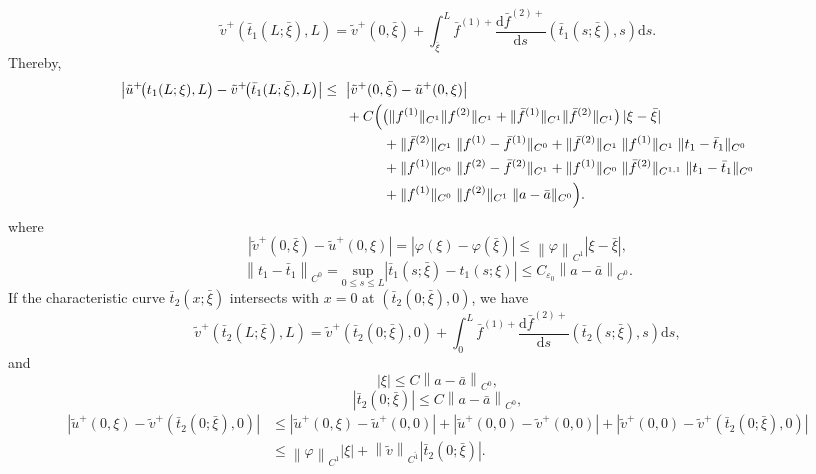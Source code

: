 \documentclass[a4paper,reqno,11pt]{amsart}
\numberwithin{equation}{section} %
\begin{document}
$$
\tilde{v}^{+}\left( \bar{t}_1\left( L;\bar{\xi} \right) ,L \right) =\tilde{v}^{+}(0,\bar{\xi})+\int_{\bar{\xi} }^L{\bar{f}^{(1)+}\frac{\mathrm{d}\bar{f}^{(2)+}}{\mathrm{d}s}\left( \bar{t}_1\left( s;\bar{\xi} \right) ,s \right) \mathrm{d}s}.
$$
Thereby,
$$
\begin{aligned}
\bigl|\tilde u^+\!\bigl(t_1(L;\xi),L\bigr)-\tilde{v}^{+}\!\bigl(\bar t_1(L;\bar\xi),L\bigr)\bigr|
\le{}&\ \bigl|\tilde{v}^{+}(0,\bar\xi)-\tilde u^+(0,\xi)\bigr| \\
&\ + C\Bigl(
   \bigl(\|f^{(1)}\|_{C^{1}}\|f^{(2)}\|_{C^{1}}
     + \|\bar f^{(1)}\|_{C^{1}}\|\bar f^{(2)}\|_{C^{1}}\bigr)\,|\xi-\bar\xi| \Bigr.\\
&\qquad\quad
   + \|\bar f^{(2)}\|_{C^{1}}\;\|f^{(1)}-\bar f^{(1)}\|_{C^{0}}
   + \|\bar f^{(2)}\|_{C^{1}}\;\|f^{(1)}\|_{C^{1}}\;\|t_1-\bar t_1\|_{C^{0}} \\
&\qquad\quad
   + \|f^{(1)}\|_{C^{0}}\;\|f^{(2)}-\bar f^{(2)}\|_{C^{1}}
   + \|f^{(1)}\|_{C^{0}}\;\|\bar f^{(2)}\|_{C^{1,1}}\;\|t_1-\bar t_1\|_{C^{0}} \\
&\qquad\quad
   + \Bigl. \|f^{(1)}\|_{C^{0}}\;\|f^{(2)}\|_{C^{1}}\;\|a-\bar a\|_{C^{0}}
\Bigr).
\end{aligned}
$$
where
$$
\left| \tilde{v}^{+}(0,\bar{\xi})-\tilde{u}^{+}(0,\xi ) \right|=\left| \varphi (\xi )-\varphi (\bar{\xi}) \right|\leq \left\| \varphi \right\| _{C^1}\left| \xi -\bar{\xi} \right|,
$$
$$
\left\| t_1-\bar{t}_1 \right\| _{C^0} =\underset{0\le s\le L}{\mathrm{sup}}\left| \bar{t}_1(s;\bar{\xi})-t_1(s;\xi ) \right|\leq C_{\varepsilon _0}\left\| a-\bar{a} \right\| _{C^0}.
$$
If the characteristic curve $\bar{t} _2(x;\bar{\xi}  )$ intersects with $x=0$ at $(\bar{t}_2(0;\bar{\xi} ),0)$, we have
$$
\tilde{v}^{+}\left( \bar{t}_2\left( L;\bar{\xi} \right) ,L \right) =\tilde{v}^{+}\left( \bar{t}_2\left( 0;\bar{\xi} \right) ,0 \right) +\int_0^L{\bar{f}^{(1)+}\frac{\mathrm{d}\bar{f}^{(2)+}}{\mathrm{d}s}\left( \bar{t}_2\left( s;\bar{\xi} \right) ,s \right) \mathrm{d}s},
$$
and
$$
	|\xi |\leq C\left\| a-\bar{a} \right\| _{C^0},
$$
$$
	\left| \bar{t}_2(0;\bar{\xi}) \right|\leq C\left\| a-\bar{a} \right\| _{C^0},
$$
$$
\begin{aligned}
	\left| \tilde{u}^{+}(0,\xi )-\tilde{v}^{+}\left( \bar{t}_2(0;\bar{\xi}),0 \right) \right|&\leq \left| \tilde{u}^{+}(0,\xi )-\tilde{u}^{+}(0,0) \right|+\left| \tilde{u}^{+}(0,0)-\tilde{v}^{+}(0,0) \right|+\left| \tilde{v}^{+}(0,0)-\tilde{v}^{+}\left( \bar{t}_2(0;\bar{\xi}),0 \right) \right|\\
	&\le \left\| \varphi \right\| _{C^1}\left| \xi \right|+\left\| \tilde{v} \right\| _{C^{\tilde{1}}}\left| \bar{t}_2(0;\bar{\xi}) \right|.
\end{aligned}
$$
\end{document}
